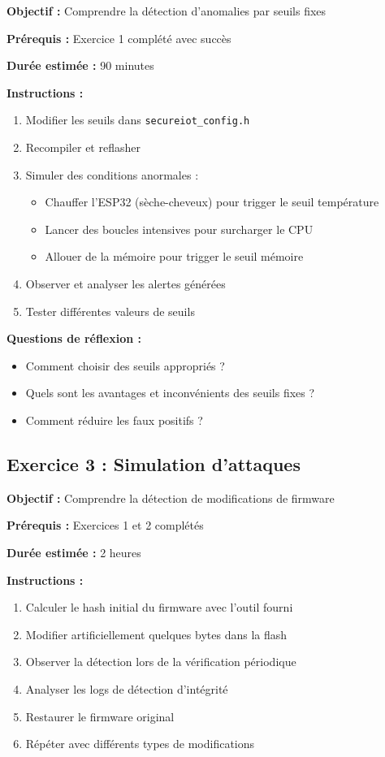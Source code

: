\textbf{Objectif :} Comprendre la détection d'anomalies par seuils fixes

\textbf{Prérequis :} Exercice 1 complété avec succès

\textbf{Durée estimée :} 90 minutes

\textbf{Instructions :}
\begin{enumerate}
    \item Modifier les seuils dans \texttt{secureiot\_config.h}
    \item Recompiler et reflasher
    \item Simuler des conditions anormales :
    \begin{itemize}
        \item Chauffer l'ESP32 (sèche-cheveux) pour trigger le seuil température
        \item Lancer des boucles intensives pour surcharger le CPU
        \item Allouer de la mémoire pour trigger le seuil mémoire
    \end{itemize}
    \item Observer et analyser les alertes générées
    \item Tester différentes valeurs de seuils
\end{enumerate}

\textbf{Questions de réflexion :}
\begin{itemize}
    \item Comment choisir des seuils appropriés ?
    \item Quels sont les avantages et inconvénients des seuils fixes ?
    \item Comment réduire les faux positifs ?
\end{itemize}

\subsection{Exercice 3 : Simulation d'attaques}

\textbf{Objectif :} Comprendre la détection de modifications de firmware

\textbf{Prérequis :} Exercices 1 et 2 complétés

\textbf{Durée estimée :} 2 heures

\textbf{Instructions :}
\begin{enumerate}
    \item Calculer le hash initial du firmware avec l'outil fourni
    \item Modifier artificiellement quelques bytes dans la flash
    \item Observer la détection lors de la vérification périodique
    \item Analyser les logs de détection d'intégrité
    \item Restaurer le firmware original
    \item Répéter avec différents types de modifications
\end{enumerate}

